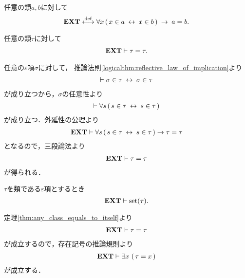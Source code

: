 	\begin{screen}
		\begin{axm}
			任意の類$a,b$に対して
			\begin{align}
				\mbox{{\bf EXT}} \overset{\mathrm{def}}{\longleftrightarrow} \forall x\, (\, x \in a \hspace{0.25em}\leftrightarrow\hspace{0.25em} x \in b\, ) 
				\hspace{0.25em}\rightarrow\hspace{0.25em} a=b.
			\end{align}
		\end{axm}
	\end{screen}
	
	\begin{screen}
		\begin{thm}[任意の類は自分自身と等しい]
			\label{thm:any_class_equals_to_itself}
			任意の類$\tau$に対して
			\begin{align}
				\mbox{{\bf EXT}} \vdash \tau = \tau.
			\end{align}
		\end{thm}
	\end{screen}
	
	\begin{sketch}
		任意の$\varepsilon$項$\sigma$に対して，
		推論法則\ref{logicalthm:reflective_law_of_implication}より
		\begin{align}
			\vdash \sigma \in \tau \hspace{0.25em}\leftrightarrow\hspace{0.25em} \sigma \in \tau
		\end{align}
		が成り立つから，$\sigma$の任意性より
		\begin{align}
			\vdash \forall s\, (\, s \in \tau  \hspace{0.25em}\leftrightarrow\hspace{0.25em} s \in \tau\, )
		\end{align}
		が成り立つ．外延性の公理より
		\begin{align}
			\mbox{{\bf EXT}} \vdash \forall s\, (\, s \in \tau  \hspace{0.25em}\leftrightarrow\hspace{0.25em} s \in \tau\, )
			\rightarrow \tau = \tau
		\end{align}
		となるので，三段論法より
		\begin{align}
			\mbox{{\bf EXT}} \vdash \tau = \tau
		\end{align}
		が得られる．
		\QED
	\end{sketch}
	
	\begin{screen}
		\begin{thm}
			$\tau$を類である$\varepsilon$項とするとき
			\begin{align}
				\mbox{{\bf EXT}} \vdash \operatorname*{set} (\tau).
			\end{align}
		\end{thm}
	\end{screen}
	
	\begin{sketch}
		定理\ref{thm:any_class_equals_to_itself}より
		\begin{align}
			\mbox{{\bf EXT}} \vdash \tau = \tau
		\end{align}
		が成立するので，存在記号の推論規則より
		\begin{align}
			\mbox{{\bf EXT}} \vdash \exists x\, \left(\, \tau = x\, \right)
		\end{align}
		が成立する．
		\QED
	\end{sketch}
	

